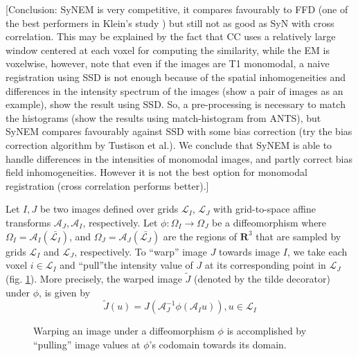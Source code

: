 [Conclusion: SyNEM is very competitive, it compares favourably to FFD (one of the best performers in Klein's study \cite{Klein2009}) but still not as good as SyN with cross
correlation. This may be explained by the fact that CC uses a relatively large window centered at each voxel for computing the similarity, while the EM is voxelwise, however, note that even if the images are T1 monomodal, a naive registration using SSD is not enough because of the spatial inhomogeneities and differences in the intensity spectrum of the images (show a pair of images as an example), show the result using SSD. So, a pre-processing is necessary to match the histograms (show the results using match-histogram from ANTS), but SyNEM compares favourably against SSD with some bias correction (try the bias correction algorithm by Tustison et al.). We conclude that SyNEM is able to handle differences in the intensities of monomodal images, and partly correct bias field inhomogeneities. However it is not the best option for monomodal registration (cross correlation performs better).]




Let $I, J$ be two images defined over grids $\mathcal{L}_{I}$, $\mathcal{L}_{J}$ with grid-to-space affine transforms $\mathcal{A}_{J}, \mathcal{A}_{I}$, respectively. Let
$\phi:\Omega_{I} \rightarrow \Omega_{J}$ be a diffeomorphism where $\Omega_{I} = \mathcal{A}_{I}(\bar{\mathcal{L}_{I}})$,
and $\Omega_{J} = \mathcal{A}_{J}(\bar{\mathcal{L}_{J}})$ are the regions of $\mathbf{R}^{3}$ that are sampled by grids $\mathcal{L}_{I}$ and $\mathcal{L}_{J}$, respectively.
To ``warp'' image $J$ towards image $I$, we take each voxel $i \in \mathcal{L}_{I}$ and ``pull''the intensity value of $J$ at its corresponding point in $\mathcal{L}_{J}$
(fig. \ref{fig:pull_back}). More precisely, the warped image $\tilde{J}$ (denoted by the tilde decorator) under $\phi$, is given by
\begin{equation}\label{eq:warp_definition}
    \tilde{J}(u) = J(\mathcal{A}_{J}^{-1}\phi(\mathcal{A}_{I}u)), u \in \mathcal{L}_{I}
\end{equation}

\begin{figure}[H]
\centering
{}
\caption{Warping an image under a diffeomorphism $\phi$ is accomplished by ``pulling'' image values at $\phi$'s codomain towards its domain.}
\label{fig:pull_back}
\end{figure}


